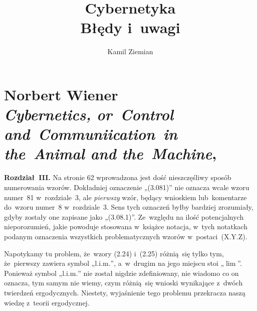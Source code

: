 \documentclass[a4paper,11pt]{article}
\title{Cybernetyka \\
  {\Large Błędy i~uwagi}}
\author{Kamil Ziemian}
\numberwithin{equation}{section}
\begin{document}





\maketitle %





\section{Norbert Wiener \\
  \textit{Cybernetics, or~Control and~Communiication~in \\
    the~Animal and the~Machine},
  \parencite{Wiener-Cybernetics-Second-edition-Pub-2016}}

\vspace{0em}



\vspace{0em}


\noindent

\textbf{Rozdział~III.} Na stronie 62 wprowadzona jest dość nieszczęśliwy
sposób numerowania wzorów. Dokładniej oznaczenie „(3.081)” nie oznacza wcale
wzoru numer~81 w~rozdziale~3, ale \textit{pierwszy} wzór, będący wnioskiem
lub~komentarze do~wzoru numer~8 w~rozdziale~3. Sens tych oznaczeń byłby
bardziej zrozumiały, gdyby zostały one zapisane jako „(3.08.1)”. Ze~względu
na ilość potencjalnych nieporozumień, jakie powoduje stosowana w~książce
notacja, w~tych notatkach podanym oznaczenia wszystkich problematycznych
wzorów w~postaci~(X.Y.Z).

\VerSpaceFour











\vspace{0em}


\noindent
{} Napotykamy tu problem, że~wzory (2.24) i~(2.25) różnią~się tylko
tym, że~pierwszy zawiera symbol „$\text{l.i.m.}$”, a~w~drugim na jego
miejscu stoi „$\lim$”. Ponieważ symbol „$\text{l.i.m.}$” nie został
nigdzie zdefiniowany, nie wiadomo co on oznacza, tym samym nie wiemy, czym
różnią~się wnioski wynikające z~dwóch twierdzeń ergodycznych. Niestety,
wyjaśnienie tego problemu przekracza naszą wiedzę z~teorii ergodycznej.
\end{document}
